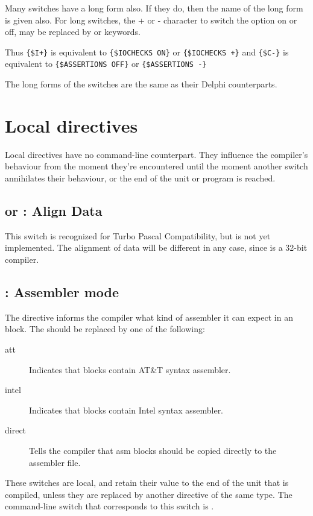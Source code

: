 \documentclass{report}
\begin{document}
Many switches have a long form also. If they do, then the name of the
long form is given also. For long switches, the + or - character to switch
the option on or off, may be replaced by  or  keywords.

Thus \verb|{$I+}| is equivalent to \verb|{$IOCHECKS ON}| or 
\verb|{$IOCHECKS +}| and 
\verb|{$C-}| is equivalent to \verb|{$ASSERTIONS OFF}| or
\verb|{$ASSERTIONS -}|

The long forms of the switches are the same as their Delphi 
counterparts.

\section{Local directives}
\label{se:LocalSwitch}
Local directives have no command-line counterpart. They influence the
compiler's behaviour from the moment they're encountered until the moment
another switch annihilates their behaviour, or the end of the unit or
program is reached.

\subsection{ or : Align Data}

This switch is recognized for Turbo Pascal Compatibility, but is not
yet implemented. The alignment of data will be different in any case, since
\fpc is a 32-bit compiler.

\subsection{ : Assembler mode}
\label{se:AsmReader}

The  directive informs the compiler what kind of assembler 
it can expect in an  block. The  should be replaced by one 
of the following:
\begin{description}
\item [att\ ] Indicates that  blocks contain AT\&T syntax assembler.
\item [intel\ ] Indicates that  blocks contain Intel syntax
assembler.
\item [direct\ ] Tells the compiler that asm blocks should be copied
directly to the assembler file.
\end{description}
These switches are local, and retain their value to the end of the unit that
is compiled, unless they are replaced by another directive of the same type.
The command-line switch that corresponds to this switch is .
\end{document}
